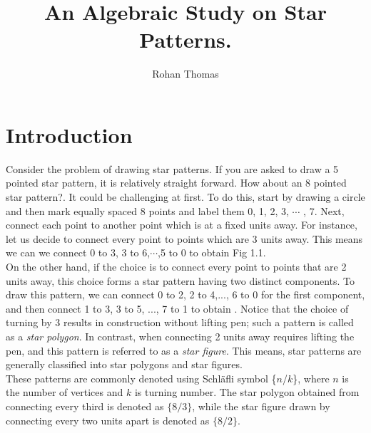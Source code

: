 \documentclass{article}
\title{An Algebraic Study on Star Patterns.}
\author{Rohan Thomas}
\begin{document}
\maketitle
\section{Introduction}
Consider the problem of drawing star patterns. If you are asked to draw a 5 pointed star pattern, it is relatively straight forward. How about an 8 pointed star pattern?. It could be challenging at first. To do this, start by drawing a circle and then mark equally spaced 8 points and label them 0, 1, 2, 3, $\cdots$ , 7.  Next, connect each point to another point which is at a fixed units away. For instance, let us decide to connect every point to points which are 3 units away. This means we can we connect 0 to 3, 3 to 6,$\cdots$,5 to 0 to obtain Fig 1.1. \\[2mm]
On the other hand, if the choice is to connect every point to points that are 2 units away, this choice forms a star pattern having two distinct components. To draw this pattern, we can connect 0 to 2, 2 to 4,..., 6 to 0 for the first component, and then connect 1 to 3, 3 to 5, ..., 7 to 1 to obtain . Notice that the choice of turning by 3 results in construction without lifting pen; such a pattern is called as a \textit{star polygon}. In contrast, when connecting 2 units away requires lifting the pen, and this pattern is referred to as a \textit{star figure}. This means, star patterns are generally classified into star polygons and star figures.\\[2mm]
These patterns are commonly denoted using Schläfli symbol \{$n$/$k$\}, where $n$ is the number of vertices and $k$ is turning number. The star polygon obtained from connecting every third is denoted as $\{8/3\}$, while the star figure drawn by connecting every two units apart is denoted as $\{8/2\}$.
\end{document}
